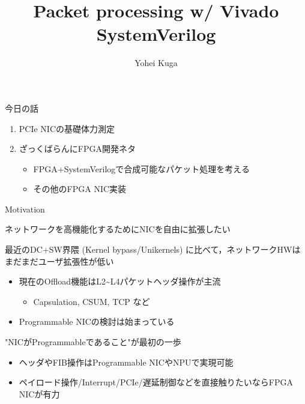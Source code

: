 \documentclass[10pt, compress]{beamer}
\title{Packet processing w/ Vivado SystemVerilog}
\subtitle{}
\date[\today]{}
\author{Yohei Kuga}
\institute{sora@haeena.net}
\begin{document}
\maketitle


\begin{frame}[fragile,t]{今日の話}
\begin{enumerate}
\item PCIe NICの基礎体力測定
\item ざっくばらんにFPGA開発ネタ
	\begin{itemize}
	\item FPGA+SystemVerilogで合成可能なパケット処理を考える
	\item その他のFPGA NIC実装
	\end{itemize}
\end{enumerate}
\end{frame}


\begin{frame}[fragile,t]{Motivation}

ネットワークを高機能化するためにNICを自由に拡張したい
\vspace{.5em}

最近のDC+SW界隈 (Kernel bypass/Unikernels) に比べて，ネットワークHWはまだまだユーザ拡張性が低い
\vspace{-.5em}
\begin{itemize}
\item 現在のOffload機能はL2\~{}L4パケットヘッダ操作が主流
    \begin{itemize}
        \item Capsulation, CSUM, TCP など
    \end{itemize}
\item Programmable NICの検討は始まっている
\end{itemize}
\vspace{.5em}

"NICがProgrammableであること"が最初の一歩
\vspace{-.5em}
\begin{itemize}
\item ヘッダやFIB操作はProgrammable NICやNPUで実現可能
\item ペイロード操作/Interrupt/PCIe/遅延制御などを直接触りたいならFPGA NICが有力
\end{itemize}

\end{frame}
\end{document}

